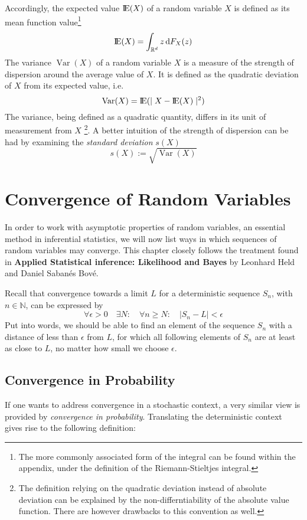 \documentclass[12pt]{article}
\newcommand*\diff{\mathop{}\!\mathrm{d}}
\newcommand{\E}{\mbox{I\negthinspace E}}
\DeclareMathOperator{\Var}{Var}
\begin{document}
Accordingly, the expected value $\E (X)$ of a random variable $X$ is defined as its mean function value\footnote{The more commonly associated form of the integral can be found within the appendix, under the definition of the Riemann-Stieltjes integral.}
\[
\E (X) = \int_{\mathbb{R}^d } z \diff F_X(z)
\]
The variance $\Var (X)$ of a random variable $X$ is a measure of the strength of dispersion around the average value of $X$. It is defined as the quadratic deviation of $X$ from its expected value, i.e.
\[
\Var (X) = \E (\mid X - \E (X) \mid ^2)
\]
The variance, being defined as a quadratic quantity, differs in its unit of measurement from $X$ \footnote{The definition relying on the quadratic deviation instead of absolute deviation can be explained by the non-differntiability of the absolute value function. There are however drawbacks to this convention as well.}. A better intuition of the strength of dispersion can be had by examining the \textit{standard deviation} $s(X)$
\[
s(X) := \sqrt{\Var (X)}
\]

\section{Convergence of Random Variables}

In order to work with asymptotic properties of random variables, an essential method in inferential statistics, we will now list ways in which sequences of random variables may converge. This chapter closely follows the treatment found in \textbf{Applied Statistical inference: Likelihood and Bayes} by Leonhard Held and Daniel Sabanés Bové. 

Recall that convergence towards a limit $L$ for a deterministic sequence $S_n$, with $n \in \mathbb{N}$, can be expressed by
\[
\forall \epsilon > 0 \quad \exists N: \quad \forall n \geq N : \quad|S_n - L| < \epsilon
\]
Put into words, we should be able to find an element of the sequence $S_n$ with a distance of less than $\epsilon$ from $L$, for which all following elements of $S_n$ are at least as close to $L$, no matter how small we choose $\epsilon$.

\subsection{Convergence in Probability}
If one wants to address convergence in a stochastic context, a very similar view is provided by \textit{convergence in probability}. Translating the deterministic context gives rise to the following definition: 
\end{document}
